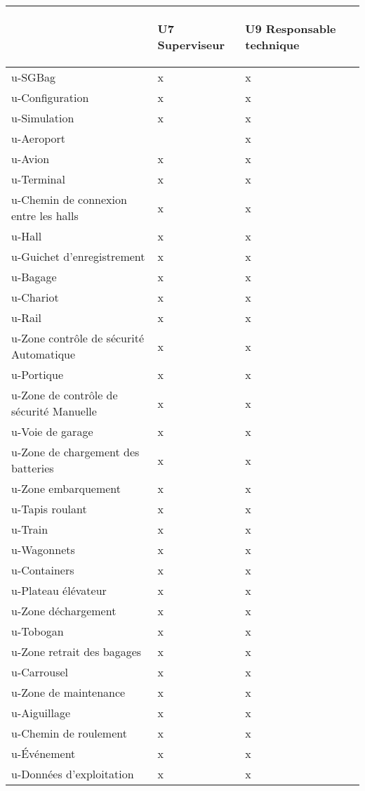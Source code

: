 \begin{center}
\begin {tabular} {| l | l | l |}
\hline
~
&\begin{sideways}U7 Superviseur\end{sideways}
&\begin{sideways}U9 Responsable technique~\end{sideways}\\
\hline
u-SGBag &x &x \\
\hline
u-Configuration &x &x \\
\hline
u-Simulation &x &x \\
\hline
u-Aeroport & &x \\
\hline
u-Avion  &x &x \\
\hline
u-Terminal  &x &x \\
\hline
u-Chemin de connexion entre les halls &x &x \\
\hline
u-Hall  &x &x \\
\hline
u-Guichet d'enregistrement &x &x \\
\hline
u-Bagage  &x &x \\
\hline
u-Chariot  &x &x \\
\hline
u-Rail &x &x \\
\hline
u-Zone contrôle de sécurité Automatique &x &x \\
\hline
u-Portique &x &x \\
\hline
u-Zone de contrôle de sécurité Manuelle &x &x \\
\hline
u-Voie de garage &x &x \\
\hline
u-Zone de chargement des batteries  &x &x \\
\hline
u-Zone embarquement  &x &x \\
\hline
u-Tapis roulant  &x &x \\
\hline
u-Train  &x &x \\
\hline
u-Wagonnets  &x &x \\
\hline
u-Containers  &x &x \\
\hline
u-Plateau élévateur  &x &x \\
\hline
u-Zone déchargement  &x &x \\
\hline
u-Tobogan  &x &x \\
\hline
u-Zone retrait des bagages  &x &x \\
\hline
u-Carrousel  &x &x \\
\hline
u-Zone de maintenance &x &x \\
\hline
u-Aiguillage &x &x \\
\hline
u-Chemin de roulement &x &x \\
\hline
u-\'{E}vénement &x &x \\
\hline
u-Données d'exploitation &x &x \\
\hline
\end {tabular}
\end{center}
